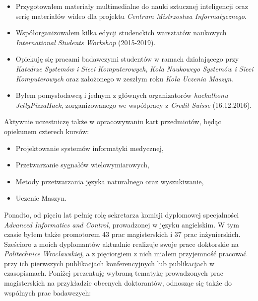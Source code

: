 \begin{itemize}
	\item Przygotowałem materiały multimedialne do nauki sztucznej inteligencji oraz serię materiałów wideo dla projektu \emph{Centrum Mistrzostwa Informatycznego}. 
	\item Współorganizowałem kilka edycji studenckich warsztatów naukowych \emph{International Students Workshop} (2015-2019).
	\item Opiekuję się pracami badawczymi studentów w ramach działającego przy \emph{Katedrze Systemów i Sieci Komputerowych}, \emph{Koła Naukowego Systemów i Sieci Komputerowych} oraz założonego w zeszłym roku \emph{Koła Uczenia Maszyn}. 
	\item Byłem pomysłodawcą i jednym z głównych organizatorów \emph{hackathonu} \emph{JellyPizzaHack}, zorganizowanego we współpracy z \emph{Credit Suisse} (16.12.2016).
\end{itemize}

Aktywnie uczestniczę także w opracowywaniu kart przedmiotów, będąc opiekunem  czterech kursów:

\begin{itemize}
	\item Projektowanie systemów informatyki medycznej,%
	\item Przetwarzanie sygnałów wielowymiarowych,%
	\item Metody przetwarzania języka naturalnego oraz wyszukiwanie,%
	\item Uczenie Maszyn.%
\end{itemize}

Ponadto, od pięciu lat pełnię rolę sekretarza komisji dyplomowej specjalności \emph{Advanced Informatics and Control}, prowadzonej w języku angielskim. W tym czasie byłem także promotorem 43 prac magisterskich i 37 prac inżynierskich. Sześcioro z moich dyplomantów aktualnie realizuje swoje prace doktorskie na \emph{Politechnice Wrocławskiej}, a z pięciorgiem z nich miałem przyjemność pracować przy ich pierwszych publikacjach konferencyjnych lub publikacjach w czasopismach. Poniżej prezentuję wybraną tematykę prowadzonych prac magisterskich na przykładzie obecnych doktorantów, odnosząc się także do wspólnych prac badawczych:

